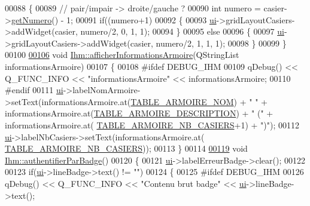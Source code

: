 \begin{DoxyCode}
00088 \{
00089     \textcolor{comment}{// pair/impair -> droite/gauche ?}
00090     \textcolor{keywordtype}{int} numero = casier->\hyperlink{class_casier_a061b024a2733a5bb1dfcc43bb0022707}{getNumero}() - 1;
00091     \textcolor{keywordflow}{if}((numero+1)%
00092     \{
00093         \hyperlink{class_ihm_a0ac5f47856566ceeeca1720109bf70ea}{ui}->gridLayoutCasiers->addWidget(casier, numero/2, 0, 1, 1);
00094     \}
00095     \textcolor{keywordflow}{else}
00096     \{
00097         \hyperlink{class_ihm_a0ac5f47856566ceeeca1720109bf70ea}{ui}->gridLayoutCasiers->addWidget(casier, numero/2, 1, 1, 1);
00098     \}
00099 \}
00100 
\hyperlink{class_ihm_a9baabf33ec07777144921013c354884e}{00106} \textcolor{keywordtype}{void} \hyperlink{class_ihm_a9baabf33ec07777144921013c354884e}{Ihm::afficherInformationsArmoire}(QStringList informationsArmoire)
00107 \{
00108 \textcolor{preprocessor}{    #ifdef DEBUG\_IHM}
00109         qDebug() << Q\_FUNC\_INFO << \textcolor{stringliteral}{"informationsArmoire"} << informationsArmoire;
00110 \textcolor{preprocessor}{    #endif}
00111     \hyperlink{class_ihm_a0ac5f47856566ceeeca1720109bf70ea}{ui}->labelNomArmoire->setText(informationsArmoire.at(\hyperlink{_armoire_8h_a8c8e83929e4df868beea17eda4fb5dadaed87f53039b2f5f5401a4b4c9ea8a706}{TABLE\_ARMOIRE\_NOM}) + \textcolor{stringliteral}{" "} + 
      informationsArmoire.at(\hyperlink{_armoire_8h_a8c8e83929e4df868beea17eda4fb5dadaa46613f3c7eb048c8392fb780e801cc8}{TABLE\_ARMOIRE\_DESCRIPTION}) + \textcolor{stringliteral}{" ("} + informationsArmoire.at(
      \hyperlink{_armoire_8h_a8c8e83929e4df868beea17eda4fb5dada92634af3316ad54be209ef14cc8a8981}{TABLE\_ARMOIRE\_NB\_CASIERS}+1) + \textcolor{stringliteral}{")"});
00112     \hyperlink{class_ihm_a0ac5f47856566ceeeca1720109bf70ea}{ui}->labelNbCasiers->setText(informationsArmoire.at(
      \hyperlink{_armoire_8h_a8c8e83929e4df868beea17eda4fb5dada92634af3316ad54be209ef14cc8a8981}{TABLE\_ARMOIRE\_NB\_CASIERS}));
00113 \}
00114 
\hyperlink{class_ihm_abf037b73a8416097f768dd6eb7e20e0e}{00119} \textcolor{keywordtype}{void} \hyperlink{class_ihm_abf037b73a8416097f768dd6eb7e20e0e}{Ihm::authentifierParBadge}()
00120 \{
00121     \hyperlink{class_ihm_a0ac5f47856566ceeeca1720109bf70ea}{ui}->labelErreurBadge->clear();
00122 
00123     \textcolor{keywordflow}{if}(\hyperlink{class_ihm_a0ac5f47856566ceeeca1720109bf70ea}{ui}->lineBadge->text() != \textcolor{stringliteral}{""})
00124     \{
00125 \textcolor{preprocessor}{        #ifdef DEBUG\_IHM}
00126             qDebug() << Q\_FUNC\_INFO << \textcolor{stringliteral}{"Contenu brut badge"} << \hyperlink{class_ihm_a0ac5f47856566ceeeca1720109bf70ea}{ui}->lineBadge->text();

\end{DoxyCode}
